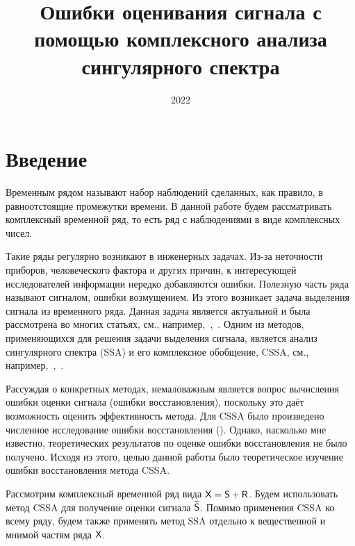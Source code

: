 \documentclass[12pt,a4paper]{article}
\title{Ошибки оценивания сигнала с помощью комплексного анализа сингулярного спектра
}
\date{2022}
\begin{document}
\maketitle

\section{Введение}


Временным рядом называют набор наблюдений сделанных, как правило, в равноотстоящие промежутки времени. В данной работе будем рассматривать комплексный временной ряд, то есть ряд с наблюдениями в виде комплексных чисел.

Такие ряды регулярно возникают в инженерных задачах. Из-за неточности приборов, человеческого фактора и других причин, к интересующей исследователей информации нередко добавляются ошибки. Полезную часть ряда называют сигналом, ошибки возмущением. Из этого возникает задача выделения сигнала из временного ряда. Данная задача является актуальной и была рассмотрена во многих статьях, см., например,~\cite{8683056},~\cite{MOOERS19731129}. Одним из методов, применяющихся для решения задачи выделения сигнала, является анализ сингулярного спектра (SSA) и его комплексное обобщение, CSSA, см., например,~\cite{7337988},~\cite{Chen}.

Рассуждая о конкретных методах, немаловажным является вопрос вычисления ошибки оценки сигнала (ошибки восстановления), поскольку это даёт возможность оценить эффективность метода. Для CSSA было произведено численное исследование ошибки восстановления (\cite{Golyandina.etal2013}). Однако, насколько мне известно, теоретических результатов по оценке ошибки восстановления не было получено. Исходя из этого, целью данной работы было теоретическое изучение ошибки восстановления метода CSSA.

Рассмотрим комплексный временной ряд вида $\textsf{X} =\textsf{S} + \textsf{R}$. Будем использовать метод CSSA для получение оценки сигнала $\widetilde{\textsf{S}}$. Помимо применения CSSA ко всему ряду, будем также применять метод SSA отдельно к вещественной и мнимой частям ряда $\textsf{X}$.
\end{document}
